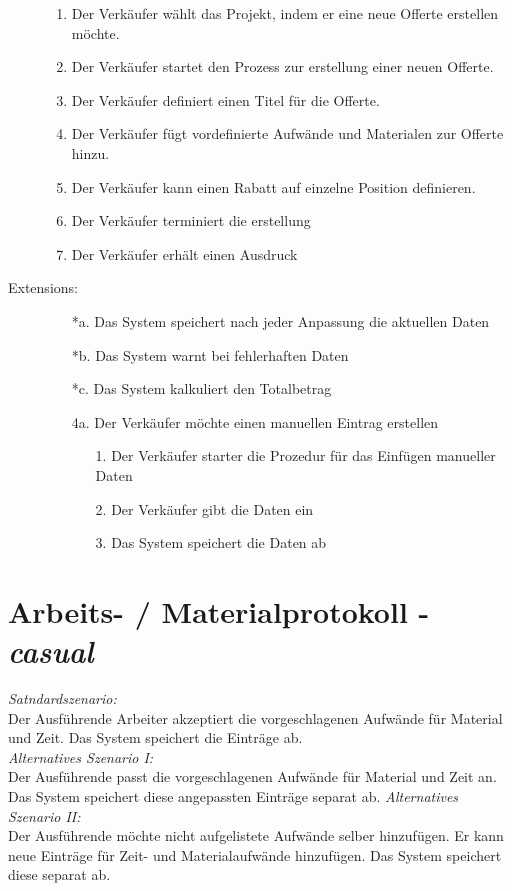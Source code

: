 \documentclass[journal]{combine}
\begin{document}
\begin{description}
\begin{enumerate}
			\item Der Verkäufer wählt das Projekt, indem er eine
			 neue Offerte erstellen möchte.
			\item Der Verkäufer startet den Prozess zur erstellung einer neuen Offerte.
			\item Der Verkäufer definiert einen Titel für die Offerte.
			\item Der Verkäufer fügt vordefinierte Aufwände und Materialen
			zur Offerte hinzu.
			\item Der Verkäufer kann einen Rabatt auf einzelne Position definieren.
			\item Der Verkäufer terminiert die erstellung
			\item Der Verkäufer erhält einen Ausdruck
		\end{enumerate}
		\newpage
		\item[Extensions:] \hfill  
		\begin{enumerate}
			\item [*a.] Das System speichert nach jeder Anpassung die aktuellen Daten
			\item [*b.] Das System warnt bei fehlerhaften Daten
			\item [*c.] Das System kalkuliert den Totalbetrag
			\item [4a.] Der Verkäufer möchte einen manuellen Eintrag erstellen
			\begin{enumerate}
				\item[1.] Der Verkäufer starter die Prozedur für das Einfügen
				manueller Daten
				\item[2.] Der Verkäufer gibt die Daten ein
				\item[3.] Das System speichert die Daten ab
			\end{enumerate}
		\end{enumerate}
	\end{description}
	
	\newpage
	\section{Arbeits- / Materialprotokoll  - \emph{casual}}
		\emph{Satndardszenario:} \\
		Der Ausführende Arbeiter akzeptiert die vorgeschlagenen Aufwände für Material
		und Zeit. Das System speichert die Einträge ab.\\
		\emph{Alternatives Szenario I:}\\
		Der Ausführende passt die vorgeschlagenen Aufwände für Material und Zeit an.
		Das System speichert diese angepassten Einträge separat ab.
		\emph{Alternatives Szenario II:}\\
		Der Ausführende möchte nicht aufgelistete Aufwände selber hinzufügen. Er kann neue
		Einträge für Zeit- und Materialaufwände hinzufügen. Das System speichert diese separat ab.
	\newpage
\end{document}
